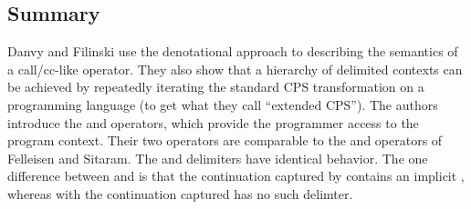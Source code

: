 \documentclass[letterpaper]{llncs}
\begin{document}
%
%
%

\subsection*{Summary}

Danvy and Filinski use the denotational approach to describing the semantics of a call/cc-like operator. They also show that a hierarchy of delimited contexts can be achieved by repeatedly iterating the standard CPS transformation on a programming language (to get what they call ``extended CPS''). The authors introduce the \shiftfn and \resetfn operators, which provide the programmer access to the program context. Their two operators are comparable to the \ctrl and \prompt operators of Felleisen and Sitaram. The \prompt and \resetfn delimiters have identical behavior. The one difference between \shiftfn and \ctrl is that the continuation captured by \shiftfn contains an implicit \resetfn, whereas with the continuation captured \ctrl has no such delimter.
\end{document}
